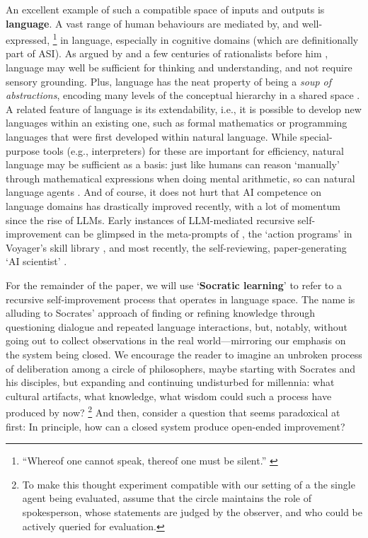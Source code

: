 \documentclass[dvipsnames]{article} %
\begin{document}
An excellent example of such a compatible space of inputs and outputs is {\bf language}. 
A vast range of human behaviours are mediated by, and well-expressed,%
\footnote{``Whereof one cannot speak, thereof one must be silent.'' \citep{wittgenstein-tractatus}}
in language, especially in cognitive domains (which are definitionally part of ASI).
As argued by \citet{chalmers2024does} and a few centuries of rationalists before him \citep{cottingham1988rationalists}, language may well be sufficient for thinking and understanding, and not require sensory grounding.
Plus, language has the neat property of being a \emph{soup of abstractions}, encoding many levels of the conceptual hierarchy in a shared space \citep[see also][]{colas2022language}.
A related feature of language is its extendability, i.e., it is possible to develop new languages within an existing one, such as formal mathematics or programming languages that were first developed within natural language.
While special-purpose tools (e.g., interpreters) for these are important for efficiency, natural language may be sufficient as a basis: just like humans can reason `manually' through mathematical expressions when doing mental arithmetic, so can natural language agents \citep{o1-blog}.
And of course, it does not hurt that AI competence on language domains has drastically improved recently, with a lot of momentum since the rise of LLMs.
Early instances of LLM-mediated recursive self-improvement can be glimpsed in the meta-prompts of \cite{fernando2023promptbreeder}, the `action programs' in Voyager's skill library \citet{wang2023voyager},
and most recently, the self-reviewing, paper-generating `AI scientist' \citep{lu2024ai}.

For the remainder of the paper, we will use `{\bf Socratic learning}' to refer to a recursive self-improvement process that operates in language space.
The name is alluding to Socrates' approach of finding or refining knowledge through questioning dialogue and repeated language interactions, 
but, notably, without going out to collect observations in the real world---mirroring our emphasis on the system being closed.
We encourage the reader to imagine an unbroken process of deliberation among a circle of philosophers, maybe starting with Socrates and his disciples, but expanding and continuing undisturbed for millennia: what cultural artifacts, what knowledge, what wisdom could such a process have produced by now?%
\footnote{To make this thought experiment compatible with our setting of a the single agent being evaluated,
assume that the circle maintains the role of spokesperson, whose statements are judged by the observer, and who could be actively queried for evaluation.
}
And then, consider a question that seems paradoxical at first: In principle, how can a closed system produce open-ended improvement?
\end{document}
